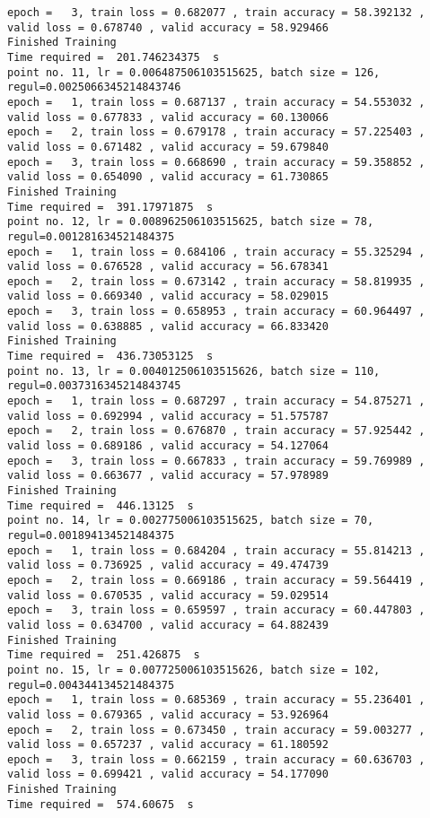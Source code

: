 \documentclass[11pt]{article}
\begin{document}
\begin{Verbatim}[commandchars=\\\{\}]
epoch =   3, train loss = 0.682077 , train accuracy = 58.392132 , valid loss = 0.678740 , valid accuracy = 58.929466
Finished Training
Time required =  201.746234375  s 
point no. 11, lr = 0.006487506103515625, batch size = 126, regul=0.0025066345214843746
epoch =   1, train loss = 0.687137 , train accuracy = 54.553032 , valid loss = 0.677833 , valid accuracy = 60.130066
epoch =   2, train loss = 0.679178 , train accuracy = 57.225403 , valid loss = 0.671482 , valid accuracy = 59.679840
epoch =   3, train loss = 0.668690 , train accuracy = 59.358852 , valid loss = 0.654090 , valid accuracy = 61.730865
Finished Training
Time required =  391.17971875  s 
point no. 12, lr = 0.008962506103515625, batch size = 78, regul=0.001281634521484375
epoch =   1, train loss = 0.684106 , train accuracy = 55.325294 , valid loss = 0.676528 , valid accuracy = 56.678341
epoch =   2, train loss = 0.673142 , train accuracy = 58.819935 , valid loss = 0.669340 , valid accuracy = 58.029015
epoch =   3, train loss = 0.658953 , train accuracy = 60.964497 , valid loss = 0.638885 , valid accuracy = 66.833420
Finished Training
Time required =  436.73053125  s 
point no. 13, lr = 0.004012506103515626, batch size = 110, regul=0.0037316345214843745
epoch =   1, train loss = 0.687297 , train accuracy = 54.875271 , valid loss = 0.692994 , valid accuracy = 51.575787
epoch =   2, train loss = 0.676870 , train accuracy = 57.925442 , valid loss = 0.689186 , valid accuracy = 54.127064
epoch =   3, train loss = 0.667833 , train accuracy = 59.769989 , valid loss = 0.663677 , valid accuracy = 57.978989
Finished Training
Time required =  446.13125  s 
point no. 14, lr = 0.002775006103515625, batch size = 70, regul=0.001894134521484375
epoch =   1, train loss = 0.684204 , train accuracy = 55.814213 , valid loss = 0.736925 , valid accuracy = 49.474739
epoch =   2, train loss = 0.669186 , train accuracy = 59.564419 , valid loss = 0.670535 , valid accuracy = 59.029514
epoch =   3, train loss = 0.659597 , train accuracy = 60.447803 , valid loss = 0.634700 , valid accuracy = 64.882439
Finished Training
Time required =  251.426875  s 
point no. 15, lr = 0.007725006103515626, batch size = 102, regul=0.004344134521484375
epoch =   1, train loss = 0.685369 , train accuracy = 55.236401 , valid loss = 0.679365 , valid accuracy = 53.926964
epoch =   2, train loss = 0.673450 , train accuracy = 59.003277 , valid loss = 0.657237 , valid accuracy = 61.180592
epoch =   3, train loss = 0.662159 , train accuracy = 60.636703 , valid loss = 0.699421 , valid accuracy = 54.177090
Finished Training
Time required =  574.60675  s 

\end{Verbatim}
\end{document}

